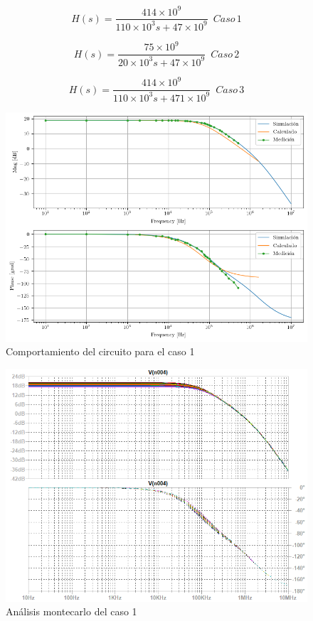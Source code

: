 \[
H(s)=\frac{414\times10^{9}}{110\times10^{3}s+47\times10^{9}}\,\,\,Caso\,1
\]

\[
H(s)=\frac{75\times10^{9}}{20\times10^{3}s+47\times10^{9}}\,\,\,Caso\,2
\]

\[
H(s)=\frac{414\times10^{9}}{110\times10^{3}s+471\times10^{9}}\,\,\,Caso\,3
\]

\begin{figure}[H]
\begin{centering}
\includegraphics[scale=0.5]{../Ex1/iB/Resources1b/H1b}
\par\end{centering}
\caption{Comportamiento del circuito para el caso 1}
\end{figure}

\begin{figure}[H]
\begin{centering}
\includegraphics[scale=0.5]{../Ex1/iB/Resources1b/Montecarlo1}
\par\end{centering}
\caption{Análisis montecarlo del caso 1}
\end{figure}

